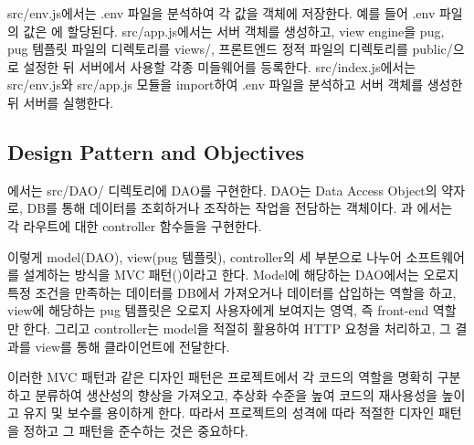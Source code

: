 src/env.js에서는 .env 파일을 분석하여 각 값을  객체에 저장한다. 예를 들어 .env 파일의  값은 에 할당된다. src/app.js에서는 서버 객체를 생성하고, view engine을 pug, pug 템플릿 파일의 디렉토리를 views/, 프론트엔드 정적 파일의 디렉토리를 public/으로 설정한 뒤 서버에서 사용할 각종 미들웨어를 등록한다. src/index.js에서는 src/env.js와 src/app.js 모듈을 import하여 .env 파일을 분석하고 서버 객체를 생성한 뒤 서버를 실행한다.

\subsection*{Design Pattern and Objectives}

에서는 src/DAO/ 디렉토리에 DAO를 구현한다. DAO는 Data Access Object의 약자로, DB를 통해 데이터를 조회하거나 조작하는 작업을 전담하는 객체이다. 과 에서는 각 라우트에 대한 controller 함수들을 구현한다.

이렇게 model(DAO), view(pug 템플릿), controller의 세 부분으로 나누어 소프트웨어를 설계하는 방식을 MVC 패턴()이라고 한다. Model에 해당하는 DAO에서는 오로지 특정 조건을 만족하는 데이터를 DB에서 가져오거나 데이터를 삽입하는 역할을 하고, view에 해당하는 pug 템플릿은 오로지 사용자에게 보여지는 영역, 즉 front-end 역할만 한다. 그리고 controller는 model을 적절히 활용하여 HTTP 요청을 처리하고, 그 결과를 view를 통해 클라이언트에 전달한다.


이러한 MVC 패턴과 같은 디자인 패턴은 프로젝트에서 각 코드의 역할을 명확히 구분하고 분류하여 생산성의 향상을 가져오고, 추상화 수준을 높여 코드의 재사용성을 높이고 유지 및 보수를 용이하게 한다. 따라서 프로젝트의 성격에 따라 적절한 디자인 패턴을 정하고 그 패턴을 준수하는 것은 중요하다.
